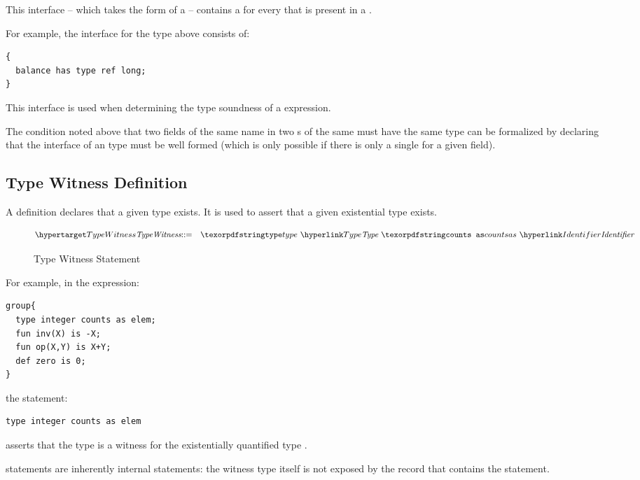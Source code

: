 This interface -- which takes the form of a  -- contains a  for every  that is present in a .

For example, the interface for the  type above consists of:
\begin{lstlisting}
{
  balance has type ref long;
}
\end{lstlisting}

This interface is used when determining the type soundness of a  expression.
\begin{aside}
The condition noted above that two fields of the same name in two s of the same  must have the same type can be formalized by declaring that the interface of an  type must be well formed (which is only possible if there is only a single  for a given field).
\end{aside}

\subsection{Type Witness Definition}
\label{countsAs}

A  definition declares that a given type exists. It is used to assert that a given existential type exists.

\begin{figure}[htbp]
\begin{eqnarray*}
\ntDef{TypeWitness}&\arrow&\q{type}\ \ntRef{Type}\ \q{counts as}\ \ntRef{Identifier}
\end{eqnarray*}
\caption{Type Witness Statement}
\label{typeCountsAsFig}
\end{figure}

For example, in the expression:
\begin{lstlisting}
group{
  type integer counts as elem;
  fun inv(X) is -X;
  fun op(X,Y) is X+Y;
  def zero is 0;
}
\end{lstlisting}
the statement:
\begin{lstlisting}
type integer counts as elem
\end{lstlisting}
asserts that the type  is a witness for the existentially quantified type .
\begin{aside}
 statements are inherently internal statements: the witness type itself is not exposed by the record that contains the  statement.
\end{aside}

